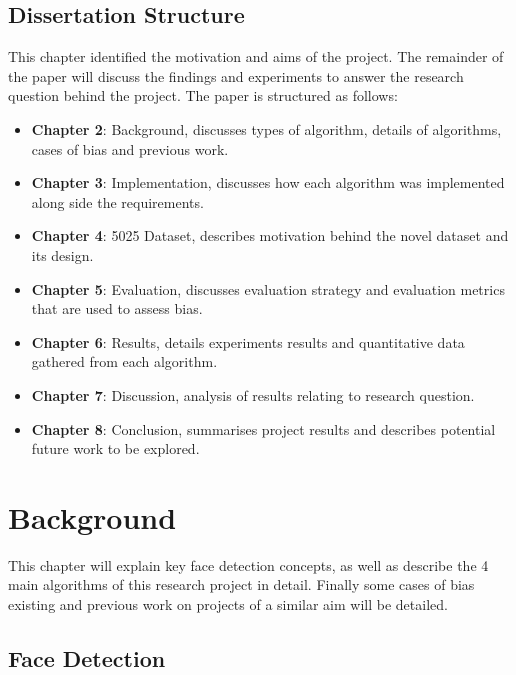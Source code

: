 \documentclass{l4proj}
\begin{document}

\section{Dissertation Structure}
\label{structure}

This chapter identified the motivation and aims of the project. The remainder of the paper will discuss the findings and experiments to answer the research question behind the project. The paper is structured as follows:
\begin{itemize}
    \item \textbf{Chapter 2}: Background, discusses types of algorithm, details of algorithms, cases of bias and previous work.
    \item \textbf{Chapter 3}: Implementation, discusses how each algorithm was implemented along side the requirements.
    \item \textbf{Chapter 4}: 5025 Dataset, describes motivation behind the novel dataset and its design.
    \item \textbf{Chapter 5}: Evaluation, discusses evaluation strategy and evaluation metrics that are used to assess bias.
    \item \textbf{Chapter 6}: Results, details experiments results and quantitative data gathered from each algorithm.
    \item \textbf{Chapter 7}: Discussion, analysis of results relating to research question.
    \item \textbf{Chapter 8}: Conclusion, summarises project results and describes potential future work to be explored.
\end{itemize}
\chapter{Background}
\label{background}
This chapter will explain key face detection concepts, as well as describe the 4 main algorithms of this research project in detail. Finally some cases of bias existing and previous work on projects of a similar aim will be detailed.
\section{Face Detection}
\label{facedetection}
\end{document}
